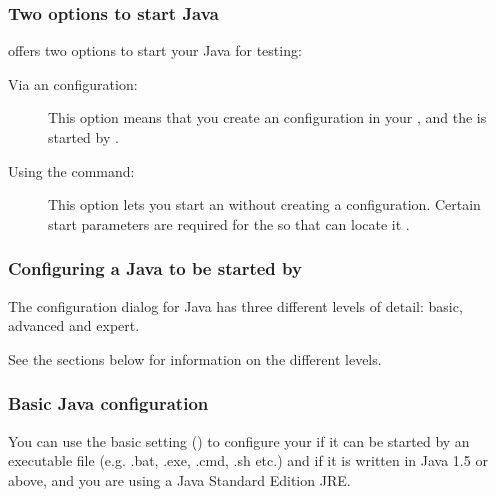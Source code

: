 \subsubsection{Two options to start Java \gdauts{}}

\app{} offers two options to start your Java \gdaut{} for testing:

\begin{description}
\item [Via an \gdaut{} configuration:]{This option means that you create an \gdaut{} configuration in your \gdproject{}, and the \gdaut{} is started by \app{} .}
\item [Using the  command:]{This option lets you start an \gdaut{} without creating a configuration. Certain start parameters are required for the \gdaut{} so that \app{} can locate it .}
\end{description}


\subsubsection{Configuring a Java \gdaut{} to be started by \app{}}
\label{TasksConfigureJavaAUT}

The \gdaut{} configuration dialog for Java has three different levels of detail: basic, advanced and expert. 

See the sections below for information on the different levels. 

\subsubsection{Basic Java \gdaut{} configuration}

You can use the basic setting () to configure your \gdaut{} if it can be started by an executable file (e.g. .bat, .exe, .cmd, .sh etc.) and if it is written in Java 1.5 or above, and you are using a Java Standard Edition JRE. 


